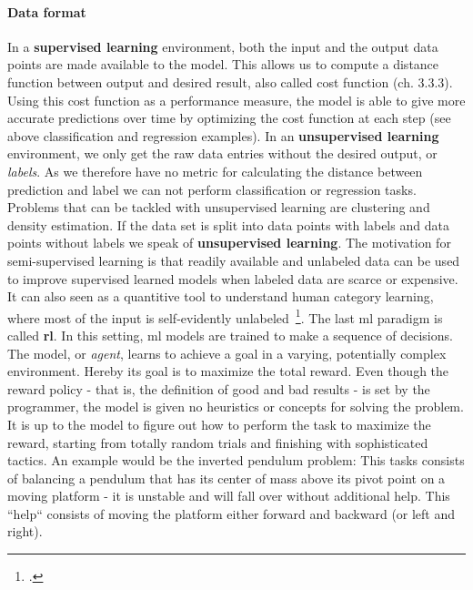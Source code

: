 \paragraph*{Data format}
In a \textbf{supervised learning} environment, both the input and the output data points are made available to the model. This allows us to compute a distance function between output and desired result, also called cost function (ch. 3.3.3). Using this cost function as a performance measure, the model is able to give more accurate predictions over time by optimizing the cost function at each step (see above classification and regression examples). In an \textbf{unsupervised learning} environment, we only get the raw data entries without the desired output, or \textit{labels}. As we therefore have no metric for calculating the distance between prediction and label we can not perform classification or regression tasks. Problems that can be tackled with unsupervised learning are clustering and density estimation. If the data set is split into data points with labels and data points without labels we speak of \textbf{unsupervised learning}. The motivation for semi-supervised learning is that readily available and unlabeled data can be used to improve supervised learned models when labeled data are scarce or expensive. It can also seen as a quantitive tool to understand human category learning, where most of the input is self-evidently unlabeled~\footcite{6813505}. The last \gls{ml} paradigm is called \textbf{\gls{rl}}. In this setting, \gls{ml} models are trained to make a sequence of decisions. The model, or \textit{agent}, learns to achieve a goal in a varying, potentially complex environment. Hereby its goal is to maximize the total reward. Even though the reward policy - that is, the definition of good and bad results - is set by the programmer, the model is given no heuristics or concepts for solving the problem. It is up to the model to figure out how to perform the task to maximize the reward, starting from totally random trials and finishing with sophisticated tactics. An example would be the inverted pendulum problem: This tasks consists of balancing a pendulum that has its center of mass above its pivot point on a moving platform - it is unstable and will fall over without additional help. This “help“ consists of moving the platform either forward and backward (or left and right).
